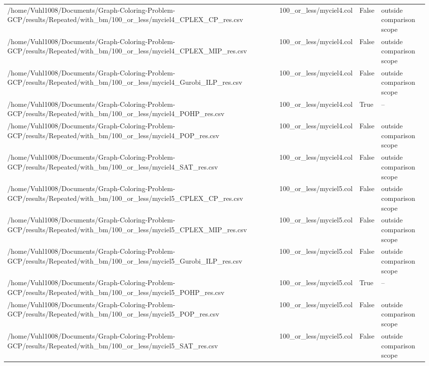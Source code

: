 \begin{table}[htbp]
\begin{tabular}{llll}
/home/Vuhl1008/Documents/Graph-Coloring-Problem-GCP/results/Repeated/with\_bm/100\_or\_less/myciel4\_CPLEX\_CP\_res.csv & 100\_or\_less/myciel4.col & False & outside comparison scope \\
/home/Vuhl1008/Documents/Graph-Coloring-Problem-GCP/results/Repeated/with\_bm/100\_or\_less/myciel4\_CPLEX\_MIP\_res.csv & 100\_or\_less/myciel4.col & False & outside comparison scope \\
/home/Vuhl1008/Documents/Graph-Coloring-Problem-GCP/results/Repeated/with\_bm/100\_or\_less/myciel4\_Gurobi\_ILP\_res.csv & 100\_or\_less/myciel4.col & False & outside comparison scope \\
/home/Vuhl1008/Documents/Graph-Coloring-Problem-GCP/results/Repeated/with\_bm/100\_or\_less/myciel4\_POHP\_res.csv & 100\_or\_less/myciel4.col & True & -- \\
/home/Vuhl1008/Documents/Graph-Coloring-Problem-GCP/results/Repeated/with\_bm/100\_or\_less/myciel4\_POP\_res.csv & 100\_or\_less/myciel4.col & False & outside comparison scope \\
/home/Vuhl1008/Documents/Graph-Coloring-Problem-GCP/results/Repeated/with\_bm/100\_or\_less/myciel4\_SAT\_res.csv & 100\_or\_less/myciel4.col & False & outside comparison scope \\
/home/Vuhl1008/Documents/Graph-Coloring-Problem-GCP/results/Repeated/with\_bm/100\_or\_less/myciel5\_CPLEX\_CP\_res.csv & 100\_or\_less/myciel5.col & False & outside comparison scope \\
/home/Vuhl1008/Documents/Graph-Coloring-Problem-GCP/results/Repeated/with\_bm/100\_or\_less/myciel5\_CPLEX\_MIP\_res.csv & 100\_or\_less/myciel5.col & False & outside comparison scope \\
/home/Vuhl1008/Documents/Graph-Coloring-Problem-GCP/results/Repeated/with\_bm/100\_or\_less/myciel5\_Gurobi\_ILP\_res.csv & 100\_or\_less/myciel5.col & False & outside comparison scope \\
/home/Vuhl1008/Documents/Graph-Coloring-Problem-GCP/results/Repeated/with\_bm/100\_or\_less/myciel5\_POHP\_res.csv & 100\_or\_less/myciel5.col & True & -- \\
/home/Vuhl1008/Documents/Graph-Coloring-Problem-GCP/results/Repeated/with\_bm/100\_or\_less/myciel5\_POP\_res.csv & 100\_or\_less/myciel5.col & False & outside comparison scope \\
/home/Vuhl1008/Documents/Graph-Coloring-Problem-GCP/results/Repeated/with\_bm/100\_or\_less/myciel5\_SAT\_res.csv & 100\_or\_less/myciel5.col & False & outside comparison scope \\

\end{tabular}
\end{table}

